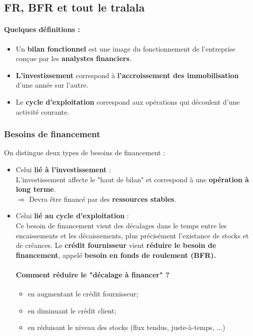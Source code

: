 \subsection{FR, BFR et tout le tralala}
\paragraph{Quelques définitions :}
\begin{itemize}

	\item Un \textbf{bilan fonctionnel} est une image du fonctionnement de l'entreprise conçue par les \textbf{analystes financiers}.
	
	\item \textbf{L'investissement} correspond à \textbf{l'accroissement des immobilisation} d'une année sur l'autre.

	\item Le \textbf{cycle d'exploitation} correspond aux opérations qui découlent d'une activité courante.
	
\end{itemize}
	
\subsubsection{Besoins de financement}
On distingue deux types de besoins de financement :\\
\begin{itemize}
	\item Celui \textbf{lié à l'investissement} :\\
		L'investissement affecte le "haut de bilan" et correspond à une \textbf{opération à long terme}.\\
		$\Rightarrow$ Devra être financé par des \textbf{ressources stables}.\\

	\item Celui \textbf{lié au cycle d'exploitation} :\\
	Ce besoin de financement vient des décalages dans le temps entre les encaissements et les décaissements, plus précisément l'existance de stocks et de créances. Le \textbf{crédit fournisseur} vient \textbf{réduire le besoin de financement}, appelé \textbf{besoin en fonds de roulement (BFR).}\\
		
	\paragraph{Comment réduire le "décalage à financer" ?}
	\begin{itemize}
		\item en augmentant le crédit fournisseur;
		\item en diminuant le crédit client;
		\item en réduisant le niveau des stocks (flux tendus, juste-à-temps, ...)
	\end{itemize}
\end{itemize}


